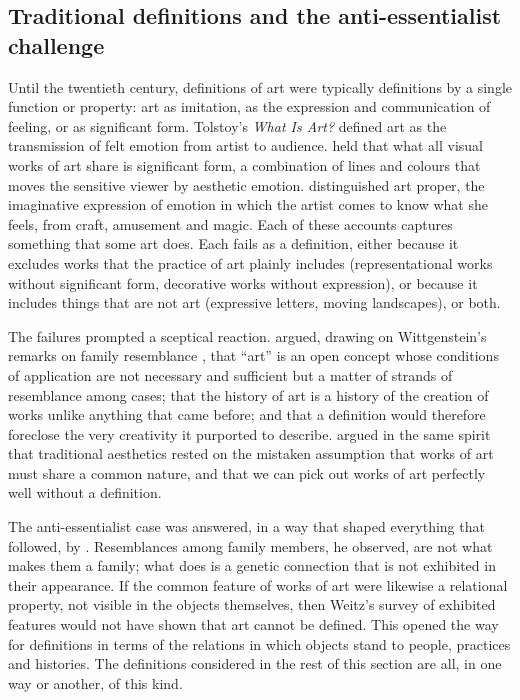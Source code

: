 \documentclass{situationist-preprint}
\begin{document}
\subsection{Traditional definitions and the anti-essentialist challenge}

Until the twentieth century, definitions of art were typically definitions by a single function or property: art as imitation, as the expression and communication of feeling, or as significant form. Tolstoy's \emph{What Is Art?} defined art as the transmission of felt emotion from artist to audience. \citet{Bell1914} held that what all visual works of art share is significant form, a combination of lines and colours that moves the sensitive viewer by aesthetic emotion. \citet{Collingwood1938} distinguished art proper, the imaginative expression of emotion in which the artist comes to know what she feels, from craft, amusement and magic. Each of these accounts captures something that some art does. Each fails as a definition, either because it excludes works that the practice of art plainly includes (representational works without significant form, decorative works without expression), or because it includes things that are not art (expressive letters, moving landscapes), or both.

The failures prompted a sceptical reaction. \citet{Weitz1956} argued, drawing on Wittgenstein's remarks on family resemblance \citep[\S\S 65--77]{Wittgenstein1953}, that \enquote{art} is an open concept whose conditions of application are not necessary and sufficient but a matter of strands of resemblance among cases; that the history of art is a history of the creation of works unlike anything that came before; and that a definition would therefore foreclose the very creativity it purported to describe. \citet{Kennick1958} argued in the same spirit that traditional aesthetics rested on the mistaken assumption that works of art must share a common nature, and that we can pick out works of art perfectly well without a definition.

The anti-essentialist case was answered, in a way that shaped everything that followed, by \citet{Mandelbaum1965}. Resemblances among family members, he observed, are not what makes them a family; what does is a genetic connection that is not exhibited in their appearance. If the common feature of works of art were likewise a relational property, not visible in the objects themselves, then Weitz's survey of exhibited features would not have shown that art cannot be defined. This opened the way for definitions in terms of the relations in which objects stand to people, practices and histories. The definitions considered in the rest of this section are all, in one way or another, of this kind.
\end{document}
